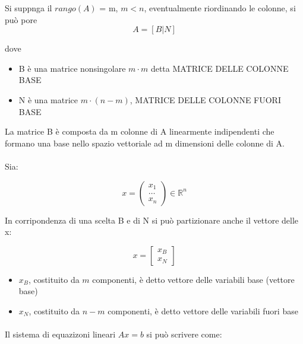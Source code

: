 \documentclass[a4paper, 11pt]{article}
\begin{document}
            Si suppnga il $rango(A)$ = m, $m < n$, eventualmente riordinando le colonne, si può pore 
            \[
                A = [B|N]
            \]

            dove 
            \begin{itemize}
                \item B è una matrice nonsingolare $m \cdot m$ detta MATRICE DELLE COLONNE BASE 
                \item N è una matrice $m \cdot (n-m)$, MATRICE DELLE COLONNE FUORI BASE
            \end{itemize}

            La matrice B è composta da m colonne di A linearmente indipendenti che formano 
            una base nello spazio vettoriale ad m dimensioni delle colonne di A.



            \paragraph{}
            Sia:


            \[
                x = 
                \begin{pmatrix}
                    x_1 \\
                    \ldots \\
                    x_n
                \end{pmatrix}
                \in \mathbb{R}^n
            \]

            In corripondenza di una scelta B e di N si può partizionare anche il vettore delle x:

            \[ x = 
            \begin{bmatrix}
                x_B \\
                x_N
            \end{bmatrix}
            \]

            \begin{itemize}
                \item $x_B$, costituito da $m$ componenti, è detto vettore delle variabili base (vettore base)
                \item $x_N$, costituito da $n-m$ componenti, è detto vettore delle variabili fuori base
            \end{itemize}



            \paragraph{}
            Il sistema di equazizoni lineari $Ax = b$ si può scrivere come:
            
\end{document}
